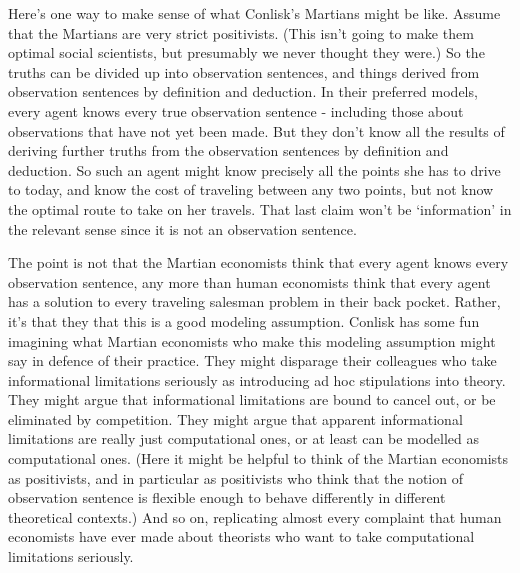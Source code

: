 \documentclass[
  10pt,
  letterpaper,
  twoside]{scrbook}
\begin{document}
Here's one way to make sense of what Conlisk's Martians might be like.
Assume that the Martians are very strict positivists. (This isn't going
to make them optimal social scientists, but presumably we never thought
they were.) So the truths can be divided up into observation sentences,
and things derived from observation sentences by definition and
deduction. In their preferred models, every agent knows every true
observation sentence - including those about observations that have not
yet been made. But they don't know all the results of deriving further
truths from the observation sentences by definition and deduction. So
such an agent might know precisely all the points she has to drive to
today, and know the cost of traveling between any two points, but not
know the optimal route to take on her travels. That last claim won't be
`information' in the relevant sense since it is not an observation
sentence.

The point is not that the Martian economists think that every agent
knows every observation sentence, any more than human economists think
that every agent has a solution to every traveling salesman problem in
their back pocket. Rather, it's that they that this is a good modeling
assumption. Conlisk has some fun imagining what Martian economists who
make this modeling assumption might say in defence of their practice.
They might disparage their colleagues who take informational limitations
seriously as introducing ad hoc stipulations into theory. They might
argue that informational limitations are bound to cancel out, or be
eliminated by competition. They might argue that apparent informational
limitations are really just computational ones, or at least can be
modelled as computational ones. (Here it might be helpful to think of
the Martian economists as positivists, and in particular as positivists
who think that the notion of observation sentence is flexible enough to
behave differently in different theoretical contexts.) And so on,
replicating almost every complaint that human economists have ever made
about theorists who want to take computational limitations seriously.
\end{document}
